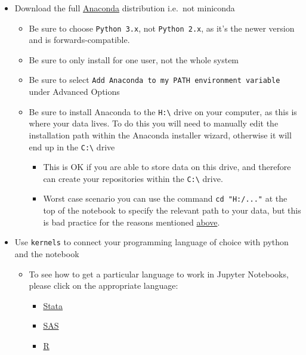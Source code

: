 \documentclass[]{book}
\providecommand{\tightlist}{%
  \setlength{\itemsep}{0pt}\setlength{\parskip}{0pt}}
\begin{document}
\begin{itemize}
\tightlist
\item
  Download the full \href{https://www.anaconda.com/download/}{Anaconda} distribution i.e.~not miniconda

  \begin{itemize}
  \tightlist
  \item
    Be sure to choose \texttt{Python\ 3.x}, not \texttt{Python\ 2.x}, as it's the newer version and is forwards-compatible.
  \item
    Be sure to only install for one user, not the whole system
  \item
    Be sure to select \texttt{Add\ Anaconda\ to\ my\ PATH\ environment\ variable} under Advanced Options
  \item
    Be sure to install Anaconda to the \texttt{H:\textbackslash{}} drive on your computer, as this is where your data lives. To do this you will need to manually edit the installation path within the Anaconda installer wizard, otherwise it will end up in the \texttt{C:\textbackslash{}} drive

    \begin{itemize}
    \tightlist
    \item
      This is OK if you are able to store data on this drive, and therefore can create your repositories within the \texttt{C:\textbackslash{}} drive.
    \item
      Worst case scenario you can use the command \texttt{cd\ "H:/..."} at the top of the notebook to specify the relevant path to your data, but this is bad practice for the reasons mentioned \protect\hyperlink{structuring-a-project}{above}.
    \end{itemize}
  \end{itemize}
\item
  Use \texttt{kernels} to connect your programming language of choice with python and the notebook

  \begin{itemize}
  \tightlist
  \item
    To see how to get a particular language to work in Jupyter Notebooks, please click on the appropriate language:

    \begin{itemize}
    \tightlist
    \item
      \protect\hyperlink{installing-the-stata-kernel}{Stata}
    \item
      \protect\hyperlink{installing-the-sas-kernel}{SAS}
    \item
      \protect\hyperlink{connecting-r-with-jupyter}{R}
    \end{itemize}
  \end{itemize}
\end{itemize}
\end{document}
